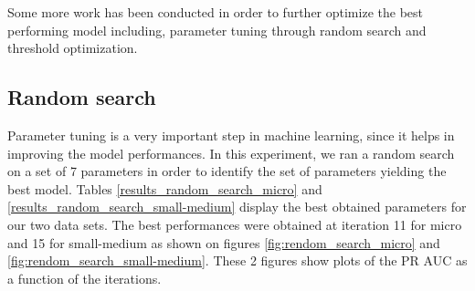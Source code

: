 \documentclass[LaM,binding=0.6cm, english]{sapthesis}
\begin{document}
\begin{table}[!ht]
\centering
{}
\vspace{2mm}
\caption{Results summary (Small-medium)}
\label{results_summary_small-medium}
\end{table}

Some more work has been conducted in order to further optimize the best performing model including, parameter tuning through random search and threshold optimization. 

\subsection{Random search}

Parameter tuning is a very important step in machine learning, since it helps in improving the model performances. In this experiment, we ran a random search on a set of 7 parameters in order to identify the set of parameters yielding the best model. Tables \ref{results_random_search_micro} and \ref{results_random_search_small-medium} display the best obtained parameters for our two data sets. The best performances were obtained at iteration 11 for micro and 15 for small-medium as shown on figures \ref{fig:rendom_search_micro} and \ref{fig:rendom_search_small-medium}. These 2 figures show plots of the PR AUC as a function of the iterations.
\end{document}
